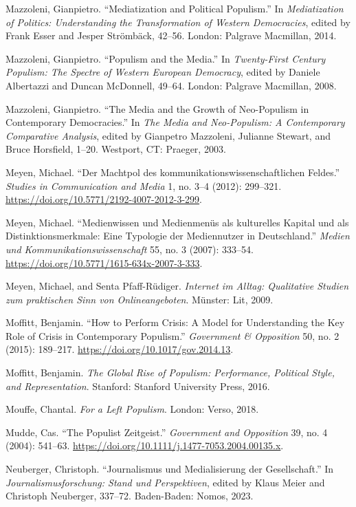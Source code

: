 \documentclass{tufte-handout}
\begin{document}
\begin{hangparas}{.25in}{1}
Mazzoleni, Gianpietro. ``Mediatization and Political Populism.'' In
\emph{Mediatization of Politics: Understanding the Transformation of
Western Democracies}, edited by Frank Esser and Jesper Strömbäck,
42--56. London: Palgrave Macmillan, 2014.

Mazzoleni, Gianpietro. ``Populism and the Media.'' In \emph{Twenty-First
Century Populism: The Spectre of Western European Democracy}, edited by
Daniele Albertazzi and Duncan McDonnell, 49--64. London: Palgrave
Macmillan, 2008.

Mazzoleni, Gianpietro. ``The Media and the Growth of Neo-Populism in
Contemporary Democracies.'' In \emph{The Media and Neo-Populism: A
Contemporary Comparative Analysis}, edited by Gianpetro Mazzoleni,
Julianne Stewart, and Bruce Horsfield, 1--20. Westport, CT: Praeger,
2003.

Meyen, Michael. ``Der Machtpol des kommunikationswissenschaftlichen
Feldes.'' \emph{Studies in Communication and Media} 1, no. 3--4 (2012):
299--321. \url{https://doi.org/10.5771/2192-4007-2012-3-299}.

Meyen, Michael. ``Medienwissen und Medienmenüs als kulturelles Kapital
und als Distinktionsmerkmale: Eine Typologie der Mediennutzer in
Deutschland.'' \emph{Medien und Kommunikationswissenschaft} 55, no. 3
(2007): 333--54. \url{https://doi.org/10.5771/1615-634x-2007-3-333}.

Meyen, Michael, and Senta Pfaff-Rüdiger. \emph{Internet im Alltag:
Qualitative Studien zum praktischen Sinn von Onlineangeboten}. Münster:
Lit, 2009.

Moffitt, Benjamin. ``How to Perform Crisis: A Model for Understanding
the Key Role of Crisis in Contemporary Populism.'' \emph{Government \&
Opposition} 50, no. 2 (2015): 189--217.
\url{https://doi.org/10.1017/gov.2014.13}.

Moffitt, Benjamin. \emph{The Global Rise of Populism: Performance,
Political Style, and Representation}. Stanford: Stanford University
Press, 2016.

Mouffe, Chantal. \emph{For a Left Populism}. London: Verso, 2018.

Mudde, Cas. ``The Populist Zeitgeist.'' \emph{Government and Opposition}
39, no. 4 (2004): 541--63.
\url{https://doi.org/10.1111/j.1477-7053.2004.00135.x}.

Neuberger, Christoph. ``Journalismus und Medialisierung der
Gesellschaft.'' In \emph{Journalismusforschung: Stand und Perspektiven},
edited by Klaus Meier and Christoph Neuberger, 337--72. Baden-Baden:
Nomos, 2023.


\end{hangparas}
\end{document}
